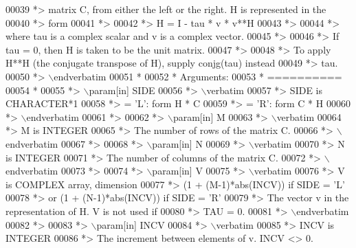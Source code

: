 \begin{DoxyCode}
00039 \textcolor{comment}{*> matrix C, from either the left or the right. H is represented in the}
00040 \textcolor{comment}{*> form}
00041 \textcolor{comment}{*>}
00042 \textcolor{comment}{*>       H = I - tau * v * v**H}
00043 \textcolor{comment}{*>}
00044 \textcolor{comment}{*> where tau is a complex scalar and v is a complex vector.}
00045 \textcolor{comment}{*>}
00046 \textcolor{comment}{*> If tau = 0, then H is taken to be the unit matrix.}
00047 \textcolor{comment}{*>}
00048 \textcolor{comment}{*> To apply H**H (the conjugate transpose of H), supply conjg(tau) instead}
00049 \textcolor{comment}{*> tau.}
00050 \textcolor{comment}{*> \(\backslash\)endverbatim}
00051 \textcolor{comment}{*}
00052 \textcolor{comment}{*  Arguments:}
00053 \textcolor{comment}{*  ==========}
00054 \textcolor{comment}{*}
00055 \textcolor{comment}{*> \(\backslash\)param[in] SIDE}
00056 \textcolor{comment}{*> \(\backslash\)verbatim}
00057 \textcolor{comment}{*>          SIDE is CHARACTER*1}
00058 \textcolor{comment}{*>          = 'L': form  H * C}
00059 \textcolor{comment}{*>          = 'R': form  C * H}
00060 \textcolor{comment}{*> \(\backslash\)endverbatim}
00061 \textcolor{comment}{*>}
00062 \textcolor{comment}{*> \(\backslash\)param[in] M}
00063 \textcolor{comment}{*> \(\backslash\)verbatim}
00064 \textcolor{comment}{*>          M is INTEGER}
00065 \textcolor{comment}{*>          The number of rows of the matrix C.}
00066 \textcolor{comment}{*> \(\backslash\)endverbatim}
00067 \textcolor{comment}{*>}
00068 \textcolor{comment}{*> \(\backslash\)param[in] N}
00069 \textcolor{comment}{*> \(\backslash\)verbatim}
00070 \textcolor{comment}{*>          N is INTEGER}
00071 \textcolor{comment}{*>          The number of columns of the matrix C.}
00072 \textcolor{comment}{*> \(\backslash\)endverbatim}
00073 \textcolor{comment}{*>}
00074 \textcolor{comment}{*> \(\backslash\)param[in] V}
00075 \textcolor{comment}{*> \(\backslash\)verbatim}
00076 \textcolor{comment}{*>          V is COMPLEX array, dimension}
00077 \textcolor{comment}{*>                     (1 + (M-1)*abs(INCV)) if SIDE = 'L'}
00078 \textcolor{comment}{*>                  or (1 + (N-1)*abs(INCV)) if SIDE = 'R'}
00079 \textcolor{comment}{*>          The vector v in the representation of H. V is not used if}
00080 \textcolor{comment}{*>          TAU = 0.}
00081 \textcolor{comment}{*> \(\backslash\)endverbatim}
00082 \textcolor{comment}{*>}
00083 \textcolor{comment}{*> \(\backslash\)param[in] INCV}
00084 \textcolor{comment}{*> \(\backslash\)verbatim}
00085 \textcolor{comment}{*>          INCV is INTEGER}
00086 \textcolor{comment}{*>          The increment between elements of v. INCV <> 0.}

\end{DoxyCode}
